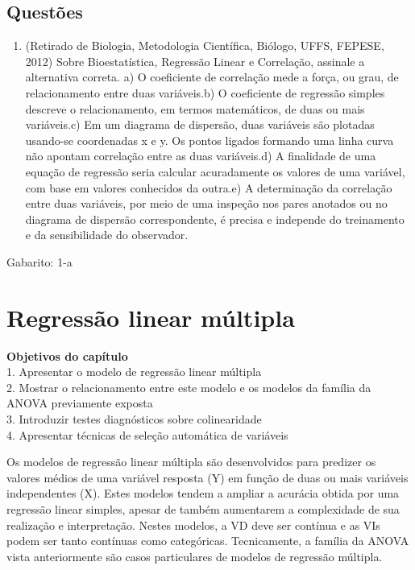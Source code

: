 \documentclass[
]{book}
\providecommand{\tightlist}{%
  \setlength{\itemsep}{0pt}\setlength{\parskip}{0pt}}
\newenvironment{objectives}{
  \definecolor{shadecolor}{rgb}{0.764,0.992,0.686}  %
  \color{black}
  \begin{shaded}}
 {\end{shaded}}
\begin{document}
\hypertarget{questuxf5es-8}{%
\section{Questões}\label{questuxf5es-8}}

\begin{enumerate}
\def\labelenumi{\arabic{enumi}.}
\tightlist
\item
  (Retirado de Biologia, Metodologia Científica, Biólogo, UFFS, FEPESE, 2012) Sobre Bioestatística, Regressão Linear e Correlação, assinale a alternativa correta. a) O coeficiente de correlação mede a força, ou grau, de relacionamento entre duas variáveis.b) O coeficiente de regressão simples descreve o relacionamento, em termos matemáticos, de duas ou mais variáveis.c) Em um diagrama de dispersão, duas variáveis são plotadas usando-se coordenadas x e y. Os pontos ligados formando uma linha curva não apontam correlação entre as duas variáveis.d) A finalidade de uma equação de regressão seria calcular acuradamente os valores de uma variável, com base em valores conhecidos da outra.e) A determinação da correlação entre duas variáveis, por meio de uma inspeção nos pares anotados ou no diagrama de dispersão correspondente, é precisa e independe do treinamento e da sensibilidade do observador.
\end{enumerate}

Gabarito: 1-a

\hypertarget{regressuxe3o-linear-muxfaltipla}{%
\chapter{Regressão linear múltipla}\label{regressuxe3o-linear-muxfaltipla}}

\begin{objectives}
\textbf{Objetivos do capítulo}\\
1. Apresentar o modelo de regressão linear múltipla\\
2. Mostrar o relacionamento entre este modelo e os modelos da família da ANOVA previamente exposta\\
3. Introduzir testes diagnósticos sobre colinearidade\\
4. Apresentar técnicas de seleção automática de variáveis

\end{objectives}

Os modelos de regressão linear múltipla são desenvolvidos para predizer os valores médios de uma variável resposta (Y) em função de duas ou mais variáveis independentes (X). Estes modelos tendem a ampliar a acurácia obtida por uma regressão linear simples, apesar de também aumentarem a complexidade de sua realização e interpretação. Nestes modelos, a VD deve ser contínua e as VIs podem ser tanto contínuas como categóricas. Tecnicamente, a família da ANOVA vista anteriormente são casos particulares de modelos de regressão múltipla.
\end{document}
